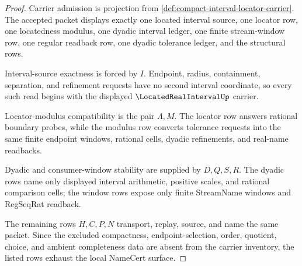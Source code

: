 \begin{proof}
Carrier admission is projection from \autoref{def:compact-interval-locator-carrier}. The accepted packet displays exactly one located interval source, one locator row, one locatedness modulus, one dyadic interval ledger, one finite stream-window row, one regular readback row, one dyadic tolerance ledger, and the structural rows.

Interval-source exactness is forced by $I$. Endpoint, radius, containment, separation, and refinement requests have no second interval coordinate, so every such read begins with the displayed $\LocatedRealIntervalUp$ carrier.

Locator-modulus compatibility is the pair $\Lambda,M$. The locator row answers rational boundary probes, while the modulus row converts tolerance requests into the same finite endpoint windows, rational cells, dyadic refinements, and real-name readbacks.

Dyadic and consumer-window stability are supplied by $D,Q,S,R$. The dyadic rows name only displayed interval arithmetic, positive scales, and rational comparison cells; the window rows expose only finite StreamName windows and RegSeqRat readback.

The remaining rows $H,C,P,N$ transport, replay, source, and name the same packet. Since the excluded compactness, endpoint-selection, order, quotient, choice, and ambient completeness data are absent from the carrier inventory, the listed rows exhaust the local NameCert surface.
\end{proof}


